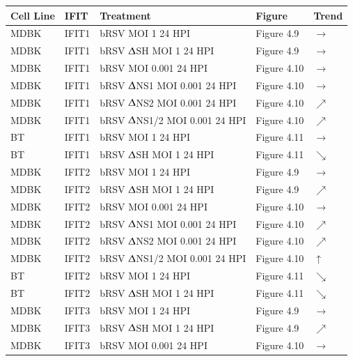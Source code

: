 \begin{table}
    \centering
    \begin{tabular}{lllll}
    \hline
	\textbf{Cell Line} & \textbf{IFIT} & \textbf{Treatment} & \textbf{Figure} & \textbf{Trend} \\ \hline
        MDBK & IFIT1 & bRSV MOI 1 24 HPI & Figure 4.9 & \(\rightarrow\) \\ 
        MDBK & IFIT1 & bRSV $\Updelta$SH MOI 1 24 HPI & Figure 4.9 & \(\rightarrow\) \\ 
        MDBK & IFIT1 & bRSV MOI 0.001 24 HPI & Figure 4.10 & \(\rightarrow\) \\ 
        MDBK & IFIT1 & bRSV $\Updelta$NS1 MOI 0.001 24 HPI & Figure 4.10 & \(\rightarrow\) \\ 
        MDBK & IFIT1 & bRSV $\Updelta$NS2 MOI 0.001 24 HPI & Figure 4.10 & \(\nearrow\) \\ 
        MDBK & IFIT1 & bRSV $\Updelta$NS1/2 MOI 0.001 24 HPI & Figure 4.10 & \(\nearrow\) \\ 
        BT & IFIT1 & bRSV MOI 1 24 HPI & Figure 4.11 & \(\rightarrow\) \\ 
        BT & IFIT1 & bRSV $\Updelta$SH MOI 1 24 HPI & Figure 4.11 & \(\searrow\) \\ 
        MDBK & IFIT2 & bRSV MOI 1 24 HPI & Figure 4.9 & \(\rightarrow\) \\ 
        MDBK & IFIT2 & bRSV $\Updelta$SH MOI 1 24 HPI & Figure 4.9 & \(\nearrow\) \\ 
        MDBK & IFIT2 & bRSV MOI 0.001 24 HPI & Figure 4.10 & \(\rightarrow\) \\ 
        MDBK & IFIT2 & bRSV $\Updelta$NS1 MOI 0.001 24 HPI & Figure 4.10 & \(\nearrow\) \\ 
        MDBK & IFIT2 & bRSV $\Updelta$NS2 MOI 0.001 24 HPI & Figure 4.10 & \(\nearrow\) \\ 
        MDBK & IFIT2 & bRSV $\Updelta$NS1/2 MOI 0.001 24 HPI & Figure 4.10 & \(\uparrow\) \\ 
        BT & IFIT2 & bRSV MOI 1 24 HPI & Figure 4.11 & \(\searrow\) \\ 
        BT & IFIT2 & bRSV $\Updelta$SH MOI 1 24 HPI & Figure 4.11 & \(\searrow\) \\ 
        MDBK & IFIT3 & bRSV MOI 1 24 HPI & Figure 4.9 & \(\rightarrow\) \\ 
        MDBK & IFIT3 & bRSV $\Updelta$SH MOI 1 24 HPI & Figure 4.9 & \(\nearrow\) \\ 
        MDBK & IFIT3 & bRSV MOI 0.001 24 HPI & Figure 4.10 & \(\rightarrow\) \\ 

\end{tabular}
\end{table}
